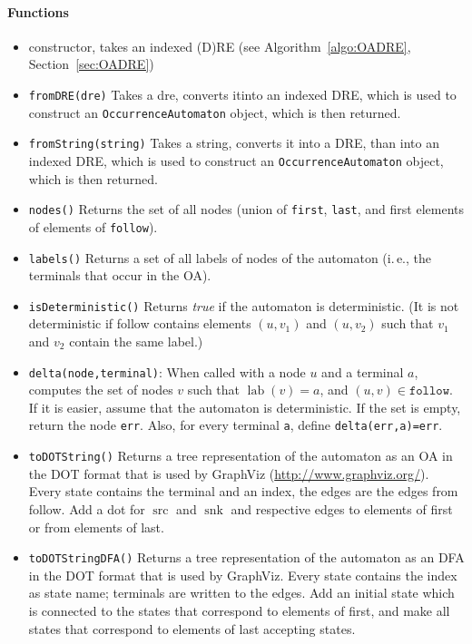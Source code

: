 \documentclass[a4paper,11pt, svgnames,titlepage]{article}
\DeclareMathOperator{\lab}{lab}
\DeclareMathOperator{\src}{src}
\DeclareMathOperator{\snk}{snk}
\begin{document}
\paragraph{Functions}
\begin{itemize}
	\item constructor, takes an indexed (D)RE (see Algorithm~\ref{algo:OADRE}, Section~\ref{sec:OADRE})
	\item \texttt{fromDRE(dre)} Takes a dre, converts itinto an indexed DRE, which is used to construct an \texttt{OccurrenceAutomaton} object, which is then returned. 
	\item \texttt{fromString(string)} Takes a string, converts it into a DRE, than into an indexed DRE, which is used to construct an \texttt{OccurrenceAutomaton} object, which is then returned. 
	\item\texttt{nodes()} Returns the set of all nodes (union of \texttt{first}, \texttt{last}, and first elements of elements of \texttt{follow}). 
	\item\texttt{labels()} Returns a set of all labels of nodes of the automaton (i.\,e., the terminals that occur in the OA).
	\item\texttt{isDeterministic()} Returns \emph{true} if the automaton is deterministic. (It is not deterministic if follow contains elements $(u,v_1)$ and $(u,v_2)$ such that $v_1$ and $v_2$ contain the same label.)
	\item\texttt{delta(node,terminal)}: When called with a node $u$ and a terminal $a$, computes the set of nodes $v$ such that $\lab(v)=a$, and $(u,v)\in\mathtt{follow}$. If it is easier, assume that the automaton is deterministic. If the set is empty, return the node \texttt{err}. Also, for every terminal \texttt{a}, define \texttt{delta(err,a)=err}.
	\item\texttt{toDOTString()} Returns a tree representation of the automaton as an OA in the DOT format that is used by GraphViz  (\url{http://www.graphviz.org/}). Every state contains the terminal and an index, the edges are the edges from follow. Add a dot for $\src$ and $\snk$ and respective edges to elements of first or from elements of last.
	\item\texttt{toDOTStringDFA()} Returns a tree representation of the automaton as an DFA in the DOT format that is used by GraphViz. Every state contains the index as state name; terminals are written to the edges. Add an initial state which is connected to the states that correspond to elements of first, and make all states that correspond to elements of last accepting states.
\end{itemize}
\newpage
\end{document}
